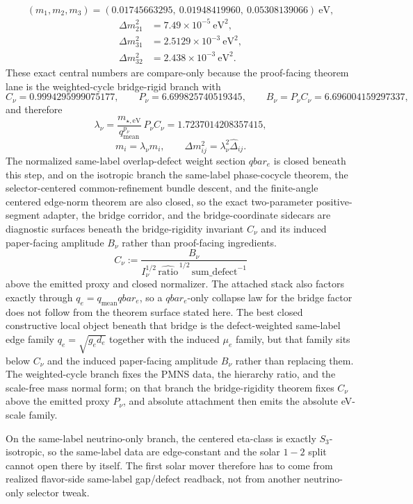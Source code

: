 \documentclass[11pt]{article}
\begin{document}
\[
(m_1,m_2,m_3)=(0.01745663295,\ 0.01948419960,\ 0.05308139066)\ \mathrm{eV},
\]
\[
\begin{aligned}
\Delta m_{21}^2&=7.49\times10^{-5}\ \mathrm{eV}^2,\\
\Delta m_{31}^2&=2.5129\times10^{-3}\ \mathrm{eV}^2,\\
\Delta m_{32}^2&=2.438\times10^{-3}\ \mathrm{eV}^2.
\end{aligned}
\]
These exact central numbers are compare-only because the proof-facing theorem lane is the weighted-cycle bridge-rigid branch with
\[
C_\nu=0.9994295999075177,\qquad
P_\nu=6.699825740519345,\qquad
B_\nu=P_\nu C_\nu=6.696004159297337,
\]
and therefore
\[
\lambda_\nu=\frac{m_{\star,\mathrm{eV}}}{q_{\mathrm{mean}}^{p_\nu}}\,P_\nu C_\nu=1.7237014208357415,
\]
\[
m_i=\lambda_\nu \widehat m_i,
\qquad
\Delta m_{ij}^2=\lambda_\nu^2 \widehat{\Delta}_{ij}.
\]
The normalized same-label overlap-defect weight section \(qbar_e\) is closed beneath
this step, and on the isotropic branch the same-label phase-cocycle theorem, the
selector-centered common-refinement bundle descent, and the finite-angle centered edge-norm
theorem are also closed, so the exact two-parameter positive-segment adapter, the bridge corridor, and the bridge-coordinate sidecars are diagnostic surfaces beneath the bridge-rigidity invariant \(C_\nu\) and its induced paper-facing amplitude \(B_\nu\) rather than proof-facing ingredients.
\[
C_\nu:=\frac{B_\nu}{I_\nu^{1/2}\,\widehat{\mathrm{ratio}}^{\,1/2}\,\mathrm{sum\_defect}^{-1}}
\]
above the emitted proxy and closed normalizer. The attached stack also factors exactly through
\(q_e = q_{\mathrm{mean}} qbar_e\), so a \(qbar_e\)-only collapse law for the bridge factor does
not follow from the theorem surface stated here. The best closed constructive local object beneath that bridge is the
defect-weighted same-label edge family \(q_e=\sqrt{g_e d_e}\) together with the induced
\(\mu_e\) family, but that family sits below \(C_\nu\) and the induced paper-facing amplitude \(B_\nu\) rather than replacing them.
The weighted-cycle branch fixes the PMNS data, the hierarchy ratio, and the
scale-free mass normal form; on that branch the bridge-rigidity theorem fixes
\(C_\nu\) above the emitted proxy \(P_\nu\), and absolute attachment then emits the
absolute eV-scale family.

On the same-label neutrino-only branch, the centered eta-class is exactly \(S_3\)-isotropic, so
the same-label data are edge-constant and the solar \(1\!-\!2\) split cannot open there by itself.
The first solar mover therefore has to come from realized flavor-side same-label gap/defect
readback, not from another neutrino-only selector tweak.
\end{document}
